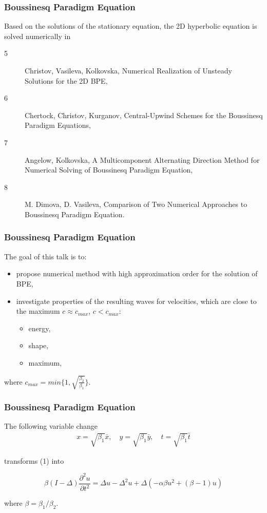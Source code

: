 \documentclass{beamer}
\newcommand{\be}{\begin{equation}}
\newcommand{\ee}{\end{equation}}
\begin{document}

\begin{frame}
\frametitle{Boussinesq Paradigm Equation}


Based on the solutions of the stationary equation, the 2D hyperbolic equation is solved numerically in 
\begin{description}
 \item[5] Christov, Vasileva, Kolkovska, Numerical Realization of Unsteady Solutions for the 2D BPE,
 \item[6] Chertock, Christov, Kurganov, Central-Upwind Schemes for the Boussinesq Paradigm Equations, 
  \item[7] Angelow, Kolkovska, A Multicomponent Alternating Direction Method for Numerical Solving of Boussinesq Paradigm Equation,
\item[8] M. Dimova, D. Vasileva, Comparison of Two Numerical Approaches to Boussinesq Paradigm Equation.
\end{description}
\end{frame}


\begin{frame}
\frametitle{Boussinesq Paradigm Equation}

The goal of this talk is to:
\begin{itemize}
 \item propose numerical method with high approximation order for the solution of BPE,
 \item investigate properties of the resulting waves for velocities, which are close to the maximum $c \approx c_{max}$, $c < c_{max}$:
	\begin{itemize}
	 \item energy,
	 \item shape,
	 \item maximum,
	\end{itemize}
\end{itemize}
where $c_{max} = min\{1, \sqrt{ \frac{\beta_2}{\beta_1} } \}$.
\end{frame}



\begin{frame}
\frametitle{Boussinesq Paradigm Equation}
The following variable change
\begin{align}
x = \sqrt{\beta_1} \bar{x}, \quad y = \sqrt{\beta_1} \bar{y}, \quad t = \sqrt{\beta_1} \bar{t}
\end{align}

transforms (1) into 

\be\label{problemVC}
\beta(I-\Delta) \frac{\partial^2 u}{\partial t^2}=
  \Delta u -\Delta^2 u +\Delta(-\alpha \beta u^2 + (\beta - 1 )u)
\ee

where $\beta = \beta_1/\beta_2$.

\end{frame}
\end{document}
